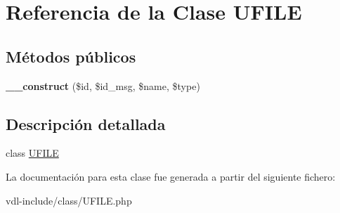 \hypertarget{class_u_f_i_l_e}{\section{Referencia de la Clase U\-F\-I\-L\-E}
\label{class_u_f_i_l_e}
}
\subsection*{Métodos públicos}
\begin{DoxyCompactItemize}
\item 
\hypertarget{class_u_f_i_l_e_a10c3b4e45c8036ffb0e9156bab06a14c}{{\bfseries \-\_\-\-\_\-construct} (\$id, \$id\-\_\-msg, \$name, \$type)}\label{class_u_f_i_l_e_a10c3b4e45c8036ffb0e9156bab06a14c}

\end{DoxyCompactItemize}


\subsection{Descripción detallada}
class \hyperlink{class_u_f_i_l_e}{U\-F\-I\-L\-E} 

La documentación para esta clase fue generada a partir del siguiente fichero\-:\begin{DoxyCompactItemize}
\item 
vdl-\/include/class/U\-F\-I\-L\-E.\-php\end{DoxyCompactItemize}
